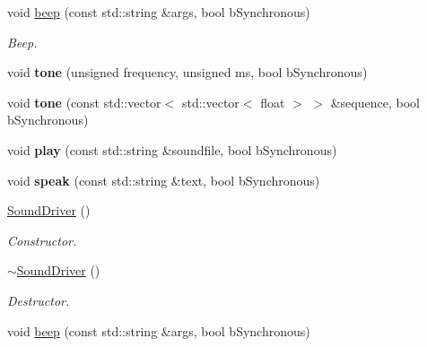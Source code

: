 \begin{DoxyCompactItemize}
\mbox{\label{classSoundDriver_a33bbfa860cd88f113d1fbf4bf68708ba}} 
void \hyperlink{classSoundDriver_a33bbfa860cd88f113d1fbf4bf68708ba}{beep} (const std\+::string \&args, bool b\+Synchronous)
\begin{DoxyCompactList}\small\item\em Beep. \end{DoxyCompactList}\item 
\mbox{\label{classSoundDriver_a73ac421559404c201308915ad9e4f8e0}} 
void {\bfseries tone} (unsigned frequency, unsigned ms, bool b\+Synchronous)
\item 
\mbox{\label{classSoundDriver_a39ea1b35ab6091e79663fa489cdcff25}} 
void {\bfseries tone} (const std\+::vector$<$ std\+::vector$<$ float $>$ $>$ \&sequence, bool b\+Synchronous)
\item 
\mbox{\label{classSoundDriver_afd64ca3d517d01947d514eb689027eea}} 
void {\bfseries play} (const std\+::string \&soundfile, bool b\+Synchronous)
\item 
\mbox{\label{classSoundDriver_a44869623a4c7ad03e9a65388647bc10c}} 
void {\bfseries speak} (const std\+::string \&text, bool b\+Synchronous)
\item 
\mbox{\label{classSoundDriver_aa45970b1e9155eb51a155cc7ef4389dc}} 
\hyperlink{classSoundDriver_aa45970b1e9155eb51a155cc7ef4389dc}{Sound\+Driver} ()
\begin{DoxyCompactList}\small\item\em Constructor. \end{DoxyCompactList}\item 
\mbox{\label{classSoundDriver_a45845cb8587a626a4ab6a2c53dcdf7c0}} 
\hyperlink{classSoundDriver_a45845cb8587a626a4ab6a2c53dcdf7c0}{$\sim$\+Sound\+Driver} ()
\begin{DoxyCompactList}\small\item\em Destructor. \end{DoxyCompactList}\item 
\mbox{\label{classSoundDriver_a33bbfa860cd88f113d1fbf4bf68708ba}} 
void \hyperlink{classSoundDriver_a33bbfa860cd88f113d1fbf4bf68708ba}{beep} (const std\+::string \&args, bool b\+Synchronous)

\end{DoxyCompactItemize}
